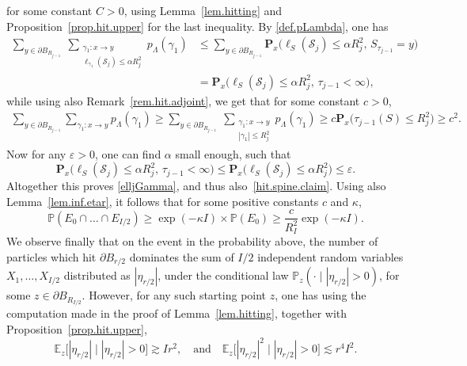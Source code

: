 \documentclass[11pt]{article}
\numberwithin{equation}{section}
\theoremstyle{plain}
\theoremstyle{definition}
\newcommand\cS{\mathcal{S}}
\newcommand{\1}{{\text{\Large $\mathfrak 1$}}}
\begin{document}
for some constant $C>0$, using Lemma~\ref{lem.hitting} and Proposition~\ref{prop.hit.upper} for the last inequality. By \eqref{def.pLambda},
one has
\begin{align*}
\sum_{y\in \partial B_{R_{j-1}}}\ \sum_{\substack{\gamma_1:x \to y \\
\ell_{\gamma_1}(\cS_j)\le \alpha R_j^2}} p_\Lambda(\gamma_1)
& \le \sum_{y\in \partial B_{R_{j-1}}}
\mathbf P_x\big(\ell_S(\cS_j) \le \alpha R_j^2,\, S_{\tau_{j-1}}=y\big)\\
& = \mathbf P_x\big(\ell_S(\cS_j) \le \alpha R_j^2,\, \tau_{j-1}<\infty \big),
\end{align*}
while using also Remark~\ref{rem.hit.adjoint}, we get that for some constant $c>0$,
\begin{align*}
\sum_{y\in \partial B_{R_{j-1}}} \sum_{\gamma_1:x \to y} p_\Lambda(\gamma_1)
\ge \sum_{y\in \partial B_{R_{j-1}}} \ \sum_{\substack{\gamma_1:x \to y \\ |\gamma_1|\le R_j^2}} p_\Lambda(\gamma_1) \ge c \mathbf P_x\big(\tau_{j-1}(S)\le R_j^2) \ge c^2.
\end{align*}
Now for any $\varepsilon>0$, one can find $\alpha$ small enough, such that
\[
\mathbf P_x\big(\ell_S(\cS_j) \le \alpha R_j^2,\, \tau_{j-1}<\infty \big)\le \mathbf P_x\big(\ell_S(\cS_j) \le \alpha R_j^2\big)\le \varepsilon.
\]
Altogether this proves \eqref{elljGamma}, and thus also~\eqref{hit.spine.claim}. Using also Lemma~\ref{lem.inf.etar}, it follows that for some positive constants $c$ and $\kappa$,
\begin{equation*}%
\mathbb P(E_0\cap \dots \cap E_{I/2}) \ge \exp(-\kappa I)\times\mathbb P(E_0) \ge \frac{c}{R_I^2} \exp(-\kappa I).
\end{equation*}
We observe finally that on the event in the probability above,
the number of particles which hit $\partial B_{r/2}$ dominates the sum of $I/2$ independent random variables $X_1,\dots,X_{I/2}$ distributed as $|\eta_{r/2}|$,
under the conditional law $\mathbb P_z(\cdot \mid |\eta_{r/2}|>0)$,
for some $z\in \partial B_{R_{I/2}}$.
However, for any such starting point $z$, one has using the computation made in the proof of Lemma~\ref{lem.hitting}, together
with Proposition~\ref{prop.hit.upper},
\[
\mathbb E_z\big[|\eta_{r/2}|\mid |\eta_{r/2}|> 0\big] \gtrsim I r^2, \quad\text{and}\quad
\mathbb E_z\big[|\eta_{r/2}|^2\mid |\eta_{r/2}|>0\big] \lesssim r^4I^2.
\]
\end{document}
